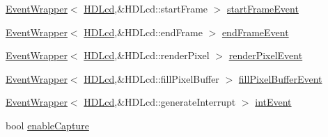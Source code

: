 \begin{DoxyCompactItemize}
\item 
\hyperlink{classEventWrapper}{EventWrapper}$<$ \hyperlink{classHDLcd}{HDLcd},\&HDLcd::startFrame $>$ \hyperlink{classHDLcd_ac7738466b6b60afeb71551c4f830d4fa}{startFrameEvent}
\item 
\hyperlink{classEventWrapper}{EventWrapper}$<$ \hyperlink{classHDLcd}{HDLcd},\&HDLcd::endFrame $>$ \hyperlink{classHDLcd_afec13618cf33587eef480a7e70dece76}{endFrameEvent}
\item 
\hyperlink{classEventWrapper}{EventWrapper}$<$ \hyperlink{classHDLcd}{HDLcd},\&HDLcd::renderPixel $>$ \hyperlink{classHDLcd_af37803439ed3050f73510b0f8e0523fc}{renderPixelEvent}
\item 
\hyperlink{classEventWrapper}{EventWrapper}$<$ \hyperlink{classHDLcd}{HDLcd},\&HDLcd::fillPixelBuffer $>$ \hyperlink{classHDLcd_a1735216e127216309b2b871f35b62fc7}{fillPixelBufferEvent}
\item 
\hyperlink{classEventWrapper}{EventWrapper}$<$ \hyperlink{classHDLcd}{HDLcd},\&HDLcd::generateInterrupt $>$ \hyperlink{classHDLcd_a5ae08b242f478669f0686028d558332a}{intEvent}
\item 
bool \hyperlink{classHDLcd_abf8ed1a0152ea70d689ffce800cd32fd}{enableCapture}
\end{DoxyCompactItemize}
